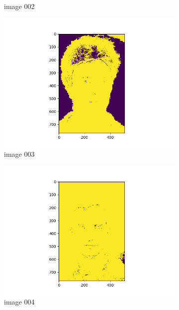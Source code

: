 \documentclass[11pt]{report}
\begin{document}
\begin{figure}[H]
\begin{subfigure}{0.3\textwidth}
        \caption{image 002}
        \label{fig:skin_colormask2}
    \end{subfigure}
    \begin{subfigure}{0.3\textwidth}
        \centering
        \includegraphics[width=\textwidth]{Task 2 Plots/skin_color_mask_003.png}
        \caption{image 003}
        \label{fig:skin_colormask3}
    \end{subfigure}
    \begin{subfigure}{0.3\textwidth}
        \centering
        \includegraphics[width=\textwidth]{Task 2 Plots/skin_color_mask_004.png}
        \caption{image 004}
        \label{fig:skin_colormask4}
    \end{subfigure}
    \begin{subfigure}{0.3\textwidth}

\end{subfigure}
\end{figure}
\end{document}
